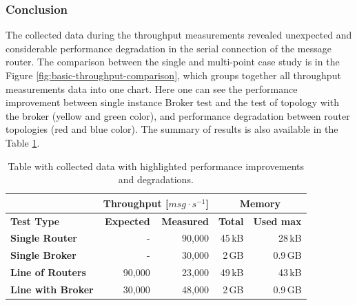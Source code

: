 \subsubsection*{Conclusion}
The collected data during the throughput measurements revealed unexpected and considerable performance degradation in the serial connection of the message router. The comparison between the single and multi-point case study is in the Figure \ref{fig:basic-throughput-comparison}, which groups together all throughput measurements data into one chart. Here one can see the performance improvement between single instance Broker test and the test of topology with the broker (yellow and green color), and performance degradation between router topologies (red and blue color). The summary of results is also available in the Table \ref{tab:throughput-summary}.

\begingroup
\setlength{\tabcolsep}{10pt} %
\renewcommand{\arraystretch}{1.35} %
	\begin{table}[h]
	\centering
	\begin{tabular}{|l|r|r|r|r|}
	\hline
	\rowcolor[HTML]{C5E3DF}
	 & \multicolumn{2}{c|}{\textbf{Throughput [$msg \cdot s^{-1}$]}} & \multicolumn{2}{c|}{\textbf{Memory}} \\ \hline
	\rowcolor[HTML]{C5E3DF}
	\textbf{Test Type} & \textbf{Expected} & \textbf{Measured} & \textbf{Total} & \textbf{Used max} \\ \hline
	\textbf{Single Router} & - & 90,000 & 45\,kB & 28\,kB \\ \hline
	\textbf{Single Broker} & - & 30,000 & 2\,GB & 0.9\,GB \\ \hline
	\textbf{Line of Routers} & 90,000 & \cellcolor[HTML]{FFCCC9}23,000 & 49\,kB & 43\,kB \\ \hline
	\textbf{Line with Broker} & 30,000 & \cellcolor[HTML]{9AFF99}48,000 & 2\,GB & 0.9\,GB \\ \hline
	\end{tabular}
	\caption{Table with collected data with highlighted performance improvements and degradations.}
	\label{tab:throughput-summary}
	\end{table}
\endgroup

